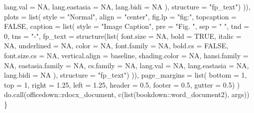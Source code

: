 \documentclass[
]{article}
\newenvironment{Shaded}{\begin{snugshade}}{\end{snugshade}}
\newcommand{\AttributeTok}[1]{\textcolor[rgb]{0.77,0.63,0.00}{#1}}
\newcommand{\ConstantTok}[1]{\textcolor[rgb]{0.00,0.00,0.00}{#1}}
\newcommand{\DecValTok}[1]{\textcolor[rgb]{0.00,0.00,0.81}{#1}}
\newcommand{\FloatTok}[1]{\textcolor[rgb]{0.00,0.00,0.81}{#1}}
\newcommand{\FunctionTok}[1]{\textcolor[rgb]{0.00,0.00,0.00}{#1}}
\newcommand{\NormalTok}[1]{#1}
\newcommand{\SpecialCharTok}[1]{\textcolor[rgb]{0.00,0.00,0.00}{#1}}
\newcommand{\StringTok}[1]{\textcolor[rgb]{0.31,0.60,0.02}{#1}}
\begin{document}
\begin{Shaded}
\begin{Highlighting}[]
          \AttributeTok{lang.val =} \ConstantTok{NA}\NormalTok{, }\AttributeTok{lang.eastasia =} \ConstantTok{NA}\NormalTok{, }\AttributeTok{lang.bidi =} \ConstantTok{NA}
\NormalTok{        ), }\AttributeTok{structure =} \StringTok{"fp\_text"}\NormalTok{)}
\NormalTok{      )),}
    \AttributeTok{plots =} \FunctionTok{list}\NormalTok{(}
      \AttributeTok{style =} \StringTok{"Normal"}\NormalTok{, }\AttributeTok{align =} \StringTok{"center"}\NormalTok{, }\AttributeTok{fig.lp =} \StringTok{"fig:"}\NormalTok{, }\AttributeTok{topcaption =} \ConstantTok{FALSE}\NormalTok{,}
      \AttributeTok{caption =} \FunctionTok{list}\NormalTok{(}
        \AttributeTok{style =} \StringTok{"Image Caption"}\NormalTok{, }\AttributeTok{pre =} \StringTok{"Fig. "}\NormalTok{, }\AttributeTok{sep =} \StringTok{" "}\NormalTok{, }\AttributeTok{tnd =} \DecValTok{0}\NormalTok{, }\AttributeTok{tns =} \StringTok{"{-}"}\NormalTok{,}
        \AttributeTok{fp\_text =} \FunctionTok{structure}\NormalTok{(}\FunctionTok{list}\NormalTok{(}
          \AttributeTok{font.size =} \ConstantTok{NA}\NormalTok{, }\AttributeTok{bold =} \ConstantTok{TRUE}\NormalTok{, }\AttributeTok{italic =} \ConstantTok{NA}\NormalTok{,}
          \AttributeTok{underlined =} \ConstantTok{NA}\NormalTok{, }\AttributeTok{color =} \ConstantTok{NA}\NormalTok{, }\AttributeTok{font.family =} \ConstantTok{NA}\NormalTok{, }\AttributeTok{bold.cs =} \ConstantTok{FALSE}\NormalTok{,}
          \AttributeTok{font.size.cs =} \ConstantTok{NA}\NormalTok{, }\AttributeTok{vertical.align =} \StringTok{\textquotesingle{}baseline\textquotesingle{}}\NormalTok{, }\AttributeTok{shading.color =} \ConstantTok{NA}\NormalTok{,}
          \AttributeTok{hansi.family =} \ConstantTok{NA}\NormalTok{, }\AttributeTok{eastasia.family =} \ConstantTok{NA}\NormalTok{, }\AttributeTok{cs.family =} \ConstantTok{NA}\NormalTok{,}
          \AttributeTok{lang.val =} \ConstantTok{NA}\NormalTok{, }\AttributeTok{lang.eastasia =} \ConstantTok{NA}\NormalTok{, }\AttributeTok{lang.bidi =} \ConstantTok{NA}
\NormalTok{        ), }\AttributeTok{structure =} \StringTok{"fp\_text"}\NormalTok{)}
\NormalTok{        )),}
    \AttributeTok{page\_margins =} \FunctionTok{list}\NormalTok{(}
      \AttributeTok{bottom =} \DecValTok{1}\NormalTok{, }\AttributeTok{top =} \DecValTok{1}\NormalTok{, }\AttributeTok{right =} \FloatTok{1.25}\NormalTok{, }\AttributeTok{left =} \FloatTok{1.25}\NormalTok{, }\AttributeTok{header =} \FloatTok{0.5}\NormalTok{,}
      \AttributeTok{footer =} \FloatTok{0.5}\NormalTok{, }\AttributeTok{gutter =} \FloatTok{0.5}\NormalTok{)}
\NormalTok{  )}
  \FunctionTok{do.call}\NormalTok{(officedown}\SpecialCharTok{::}\NormalTok{rdocx\_document, }\FunctionTok{c}\NormalTok{(}\FunctionTok{list}\NormalTok{(}\StringTok{\textquotesingle{}bookdown::word\_document2\textquotesingle{}}\NormalTok{), args))}
\NormalTok{\}}
\end{Highlighting}
\end{Shaded}
\end{document}

